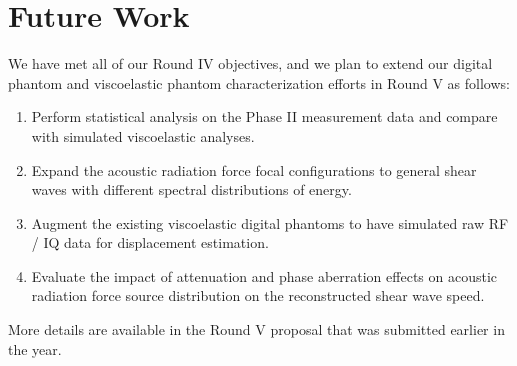\section{Future Work}\label{sect:future_work}

We have met all of our Round IV objectives, and we plan to extend our digital
phantom and viscoelastic phantom characterization efforts in Round V as
follows:

\begin{enumerate}
    \item Perform statistical analysis on the Phase II measurement data and
    compare with simulated viscoelastic analyses.
    \item Expand the acoustic radiation force focal configurations to general
    shear waves with different spectral distributions of energy.
    \item Augment the existing viscoelastic digital phantoms to have simulated
    raw RF / IQ data for displacement estimation.
    \item Evaluate the impact of attenuation and phase aberration effects on
    acoustic radiation force source distribution on the reconstructed shear
    wave speed.
\end{enumerate}

More details are available in the Round V proposal that was submitted earlier in the year.
